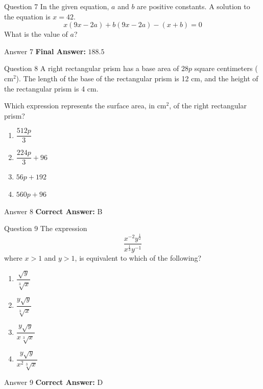 \documentclass{beamer}
\begin{document}
\begin{frame}{Question 7}
\small
In the given equation, \(a\) and \(b\) are positive constants. A solution to the equation is \(x = 42\).
\[
x(9x - 2a) + b(9x - 2a) - (x + b) = 0
\]
What is the value of \(a\)?
\end{frame}
\begin{frame}{Answer 7}
\small
\textbf{Final Answer:} $\boxed{188.5}$
\end{frame}

\begin{frame}{Question 8}
\small
A right rectangular prism has a base area of \(28p\) square centimeters (\(\text{cm}^2\)). The length of the base of the rectangular prism is 12 cm, and the height of the rectangular prism is 4 cm.

Which expression represents the surface area, in \(\text{cm}^2\), of the right rectangular prism?
\vspace{0.35cm}
\begin{enumerate}
    \item[A.] \(\dfrac{512p}{3}\)
    \item[B.] \(\dfrac{224p}{3} + 96\)
    \item[C.] \(56p + 192\)
    \item[D.] \(560p + 96\)
\end{enumerate}
\end{frame}
\begin{frame}{Answer 8}
\small
\textbf{Correct Answer:} B
\end{frame}

\begin{frame}{Question 9}
\small
The expression
\[
\frac{x^{-2}y^{\frac{1}{2}}}{x^{\frac{1}{3}} y^{-1}}
\]
where \(x > 1\) and \(y > 1\), is equivalent to which of the following?
\vspace{0.35cm}
\begin{enumerate}
    \item[A.] \(\dfrac{\sqrt{y}}{\sqrt[3]{x}}\)
    \item[B.] \(\dfrac{y\sqrt{y}}{\sqrt[3]{x}}\)
    \item[C.] \(\dfrac{y\sqrt{y}}{x\sqrt[3]{x}}\)
    \item[D.] \(\dfrac{y\sqrt{y}}{x^2\sqrt[3]{x}}\)
\end{enumerate}
\end{frame}
\begin{frame}{Answer 9}
\small
\textbf{Correct Answer:} D
\end{frame}
\end{document}
